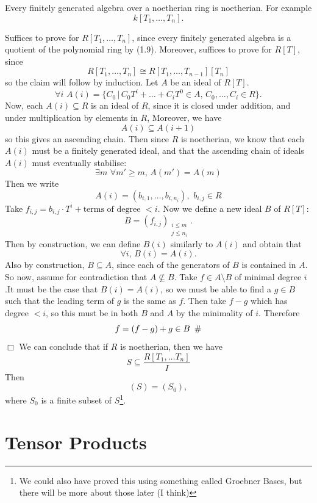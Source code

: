 \documentclass{article}
\begin{document}
\newlec

\begin{fancythm}
    Every finitely generated algebra over a noetherian ring is noetherian. For example \[
    k[T_{1},\dots, T_{n}]. \]
\end{fancythm}
    \proof Suffices to prove for $R[T_{1}, \dots, T_{n}]$, since every finitely generated algebra is a quotient of the polynomial ring by (1.9). Moreover, suffices to prove for $R[T]$, since 
    \[ 
    R[T_{1}, \dots , T_{n}] \cong R[T_{1}, \dots, T_{n-1}][T_{n}]\] so the claim will follow by induction.
    Let $A$ be an ideal of $R[T]$. \[
    \forall i \, \, A(i) = \{C_{0} \, | \, C_{0}T^{i} + \dots + C_{i}T^{0} \in A, \, C_{0},\dots, C_{i} \in R \}. \]
    Now, each $A(i) \subseteq R$ is an ideal of $R$, since it is closed under addition, and under multiplication by elements in $R$, Moreover, we have \[ A(i) \subseteq A(i+1) \] so this gives an ascending chain. Then since $R$ is noetherian, we know that each $A(i)$ must be a finitely generated ideal, and that the ascending chain of ideals $A(i)$ must eventually stabilise: \[
    \exists m \, \, \forall m' \geq m , \, A(m')=A(m) \] Then we write
    \[ A(i) = (b_{i,1}, \dots, b_{i,n_{i}}), \, \, b_{i,j} \in R\]
    Take $f_{i,j} = b_{i,j} \cdot T^{i} + \text{terms of degree $< i$}$. Now we define a new ideal $B$ of $R[T]$: \[
    B= (f_{i,j})_{\substack{i\leq m \\ j \leq n_{i}}}. \] Then by construction, we can define $B(i)$ similarly to $A(i)$ and obtain that \[ \forall i, \, B(i) = A(i). \] Also by construction, $B \subseteq A$, since each of the generators of $B$ is contained in $A$. So now, assume for contradiction that $A \nsubseteq B$. Take $f \in A\setminus B$ of minimal degree $i$.\gap It must be the case that $B(i)=A(i)$, so we must be able to find a $g \in B$ such that the leading term of $g$ is the same as $f$. Then take $f-g$ which has degree $<i$, so this must be in both $B$ and $A$ by the minimality of $i$. Therefore
    \[ f = (f-g) + g \in B \, \, \,\# \]
    \flushright $\Box$
    \flushleft
    We can conclude that if $R$ is noetherian, then we have \[ S \subseteq \frac{R[T_{1}, \dots T_{n}]}{I} \] Then \[ (S) = (S_{0}),\]
    where $S_{0}$ is a finite subset of $S$\footnote{We could also have proved this using something called Groebner Bases, but there will be more about those later (I think)}.
\section{Tensor Products}
\end{document}
